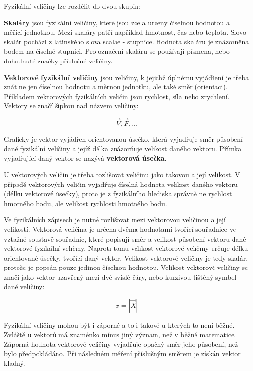 
Fyzikální veličiny lze rozdělit do dvou skupin:


{\bf Skaláry} jsou fyzikální veličiny, které jsou zcela určeny číselnou hodnotou a měřící jednotkou. Mezi skaláry patří například hmotnost, čas nebo teplota. Slovo skalár pochází z latinského slova scalae - stupnice. Hodnota skaláru je znázorněna bodem na číselné stupnici. Pro označení skaláru se používají písmena, nebo dohodnuté značky příslušné veličiny.

{\bf Vektorové fyzikální veličiny} jsou veličiny, k jejichž úplnému vyjádření je třeba znát ne jen číselnou hodnotu a měrnou jednotku, ale také směr (orientaci). Příkladem vektorových fyzikálních veličin jsou rychlost, síla nebo zrychlení. Vektory se značí šipkou nad názvem veličiny:

$$ \overrightarrow{V}, \overrightarrow{F}, ... $$

Graficky je vektor vyjádřen orientovanou úsečko, která vyjadřuje směr působení dané fyzikální veličiny a jejíž délka znázorňuje velikost daného vektoru. Přímka vyjadřující daný vektor se nazývá {\bf vektorová úsečka}.

U vektorových veličin je třeba rozlišovat veličinu jako takovou a její velikost. V případě vektorových veličin vyjadřuje číselná hodnota velikost daného vektoru (délku vektorové úsečky), proto je z fyzikálního hlediska správně ne rychlost hmotného bodu, ale velikost rychlosti hmotného bodu.

Ve fyzikálních zápisech je nutné rozlišovat mezi vektorovou veličinou a její velikostí. Vektorová veličina je určena dvěma hodnotami tvořící souřadnice ve vztažné soustavě souřadnic, které popisují směr a velikost působení vektoru dané vektorové fyzikální veličiny. Naproti tomu velikost vektorové veličiny určuje délku orientované úsečky, tvořící daný vektor. Velikost vektorové veličiny je tedy skalár, protože je popsán pouze jedinou číselnou hodnotou. Velikost vektorové veličiny se značí jako vektor uzavřený mezi dvě svislé čáry, nebo kurzivou tištěný symbol dané veličiny:

$$ x =  |\overrightarrow{X}|$$

Fyzikální veličiny mohou být i záporné a to i takové u kterých to není běžné. Zvláště u vektorů má znaménko mínus jiný význam, než v běžné matematice. Záporná hodnota vektorové veličiny vyjadřuje opačný směr jeho působení, než bylo předpokládáno. Při následném měření příslušným směrem je získán vektor kladný. 

